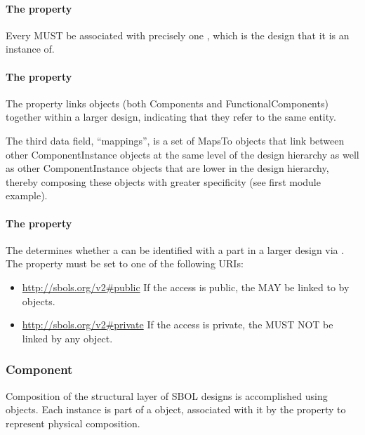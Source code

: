 \paragraph{The  property}
\label{sec:componentDefinition}

Every  MUST be associated with precisely one
, which is the design that it is an instance of.

\paragraph{The  property}
\label{sec:mapsTo}

The  property links  objects (both Components and FunctionalComponents) together within a larger design, indicating that they refer to the same entity.

The third data field, ``mappings'', is a set of MapsTo objects that link between other ComponentInstance objects at the same level of the design hierarchy as well as other ComponentInstance objects that are lower in the design hierarchy, thereby composing these objects with greater specificity (see first module example).

\paragraph{The  property}
\label{sec:access}

The  determines whether a  
can be identified with a part in a larger design via .
The  property must be set to one of the following URIs:

\begin{itemize}
\item \url{http://sbols.org/v2#public}
  If the access is public, the  MAY be linked to by  objects.

\item \url{http://sbols.org/v2#private}
  If the access is private, the  MUST NOT be linked by any  object.
\end{itemize}


\subsubsection{Component}
\label{sec:Component}
Composition of the structural layer of SBOL designs is accomplished using  objects. Each  instance is part of a  object, associated with it by the  property to represent  physical composition.  

